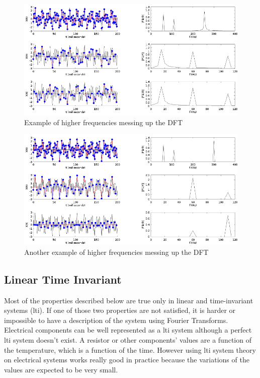 \begin{figure}
    \centering
    \includegraphics[width=\textwidth]{img/nyquist-shannon.png}
    \caption{Example of higher frequencies messing up the DFT}
    \label{fig:nyquist-shannon}
\end{figure}

\begin{figure}
    \centering
    \includegraphics[width=\textwidth]{img/nyquist-shannon-2.png}
    \caption{Another example of higher frequencies messing up the DFT}
    \label{fig:nyquist-shannon-2}
\end{figure}


\subsection{Linear Time Invariant}
Most of the properties described below are true only in linear and time-invariant systems (\acrshort{lti}). If one of those two properties are not satisfied, it is harder or impossible to have a description of the system using Fourier Transforms. Electrical components can be well represented as a \acrshort{lti} system although a perfect \acrshort{lti} system doesn't exist. A resistor or other components' values are a function of the temperature, which is a function of the time. However using \acrshort{lti} system theory on electrical systems works really good in practice because the variations of the values are expected to be very small.


